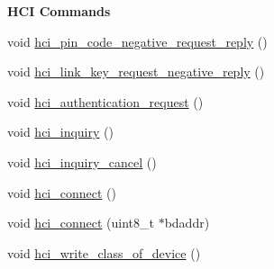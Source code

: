 \begin{Indent}{\bf \-H\-C\-I \-Commands}
\begin{DoxyCompactItemize}
void \hyperlink{class_b_t_d_a7114d2cb62aa413e5ecb25c45c76832b}{hci\-\_\-pin\-\_\-code\-\_\-negative\-\_\-request\-\_\-reply} ()
\item 
void \hyperlink{class_b_t_d_af4d28b9c1a3b9688a1871610caee2cfc}{hci\-\_\-link\-\_\-key\-\_\-request\-\_\-negative\-\_\-reply} ()
\item 
void \hyperlink{class_b_t_d_addd07c18c725a324a05792a83026d36d}{hci\-\_\-authentication\-\_\-request} ()
\item 
void \hyperlink{class_b_t_d_a678f2c995553ce6a9f48f9b59f2f1555}{hci\-\_\-inquiry} ()
\item 
void \hyperlink{class_b_t_d_a45ffbc7a40bbb763b0ece907c3dfc9ff}{hci\-\_\-inquiry\-\_\-cancel} ()
\item 
void \hyperlink{class_b_t_d_ae7066ea743f8907708db945ebef3ad76}{hci\-\_\-connect} ()
\item 
void \hyperlink{class_b_t_d_ac6c4a65645421fc4be3743d41ef3a924}{hci\-\_\-connect} (uint8\-\_\-t $\ast$bdaddr)
\item 
void \hyperlink{class_b_t_d_a9a17405df60591b909ff1502fb8f3141}{hci\-\_\-write\-\_\-class\-\_\-of\-\_\-device} ()
\end{DoxyCompactItemize}
\end{Indent}
